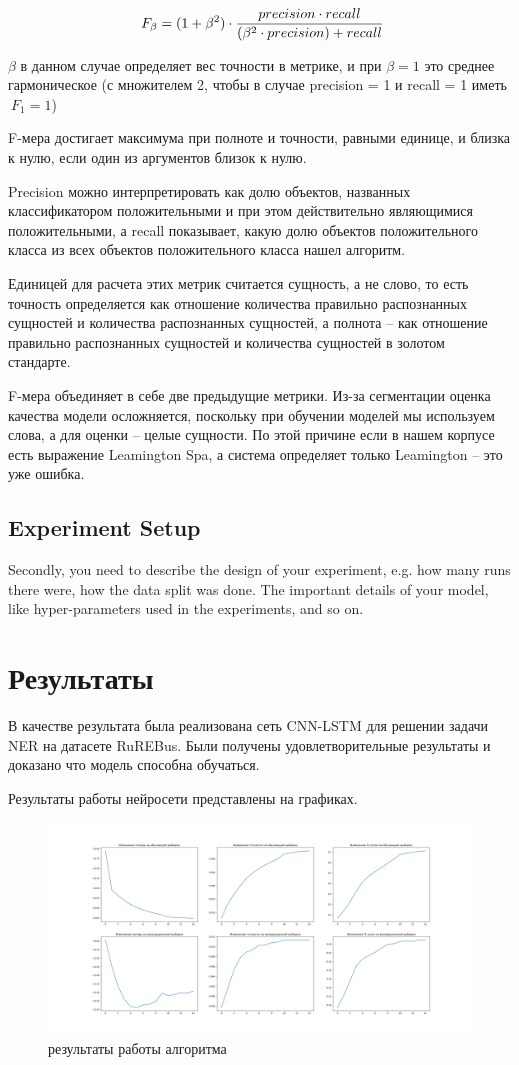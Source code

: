 \documentclass{article}
\begin{document}
$$\large \ F_\beta = (1 + \beta^2) \cdot \frac{precision \cdot recall}{(\beta^2 \cdot precision) + recall}$$


$\beta$ в данном случае определяет вес точности в метрике, и при $\beta = 1$ это среднее гармоническое (с множителем 2, чтобы в случае precision = 1 и recall = 1 иметь $\ F_1 = 1$)

F-мера достигает максимума при полноте и точности, равными единице, и близка к нулю, если один из аргументов близок к нулю.

Precision можно интерпретировать как долю объектов, названных классификатором положительными и при этом действительно являющимися положительными, а recall показывает, какую долю объектов положительного класса из всех объектов положительного класса нашел алгоритм.

Единицей для расчета этих метрик считается сущность, а не слово, то есть точность определяется как отношение количества правильно распознанных сущностей и количества распознанных сущностей, а полнота – как отношение правильно распознанных сущностей и количества сущностей в золотом стандарте. 

F-мера объединяет в себе две предыдущие метрики.
Из-за сегментации оценка качества модели осложняется, поскольку при обучении моделей мы используем слова, а для оценки – целые сущности. По этой причине если в нашем корпусе есть выражение Leamington Spa, а система определяет только Leamington – это уже ошибка.


\subsection{Experiment Setup}
Secondly, you need to describe the design of your experiment, e.g. how many runs there were, how the data split was done. The important details of your model, like hyper-parameters used in the experiments, and so on.


\section{Результаты}
В качестве результата была реализована сеть CNN-LSTM для решении задачи NER на датасете RuREBus. Были получены удовлетворительные результаты и доказано что модель способна обучаться.

Результаты работы нейросети представлены на графиках.

\begin{figure}[!tbh]
    \centering
    \includegraphics[width=0.9\linewidth]{res.png}
    \caption{результаты работы алгоритма}
    \label{fig:circle}
\end{figure}
\end{document}
